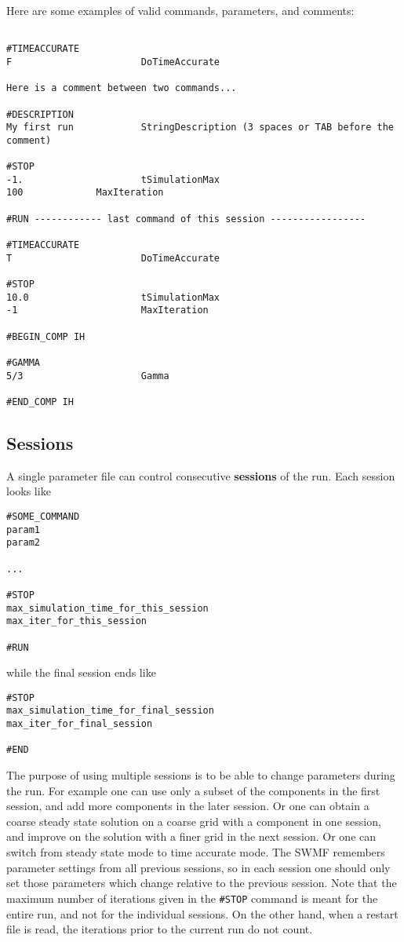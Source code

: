Here are some examples of valid commands, parameters, and comments:
\begin{verbatim}

#TIMEACCURATE
F                       DoTimeAccurate

Here is a comment between two commands...

#DESCRIPTION
My first run            StringDescription (3 spaces or TAB before the comment)

#STOP
-1.                     tSimulationMax
100		        MaxIteration

#RUN ------------ last command of this session -----------------

#TIMEACCURATE
T                       DoTimeAccurate

#STOP
10.0                    tSimulationMax
-1                      MaxIteration

#BEGIN_COMP IH

#GAMMA
5/3                     Gamma

#END_COMP IH

\end{verbatim}

\subsection{Sessions \label{section:sessions}}

A single parameter file can control consecutive {\bf sessions}
of the run. Each session looks like
\begin{verbatim}
#SOME_COMMAND
param1
param2

...

#STOP
max_simulation_time_for_this_session
max_iter_for_this_session

#RUN
\end{verbatim}
while the final session ends like
\begin{verbatim}
#STOP
max_simulation_time_for_final_session
max_iter_for_final_session

#END
\end{verbatim}
The purpose of using multiple sessions is to be able to change parameters 
during the run. For example one can use only a subset of the
components in the first session, and add more components in the
later session. Or one can obtain a coarse steady state solution
on a coarse grid with a component in one session, and improve on the solution
with a finer grid in the next session. Or one can switch from 
steady state mode to time accurate mode. The SWMF remembers parameter
settings from all previous sessions, so in each session one should only
set those parameters which change relative to the previous session.
Note that the maximum number of iterations given in the {\tt \#STOP} command 
is meant for the entire run, and not for the individual sessions. 
On the other hand, when a restart file is read, the iterations prior to 
the current run do not count.


